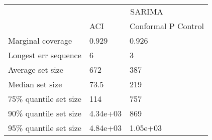 \begin{tabular}{lll}
\toprule
& \multicolumn{2}{c}{SARIMA} \\
& ACI & Conformal P Control \\
\midrule
Marginal coverage & 0.929 & 0.926 \\
Longest err sequence & 6 & 3 \\
Average set size & 672 & 387 \\
Median set size & 73.5 & 219 \\
75\% quantile set size & 114 & 757 \\
90\% quantile set size & 4.34e+03 & 869 \\
95\% quantile set size & 4.84e+03 & 1.05e+03 \\
\bottomrule
\end{tabular}
